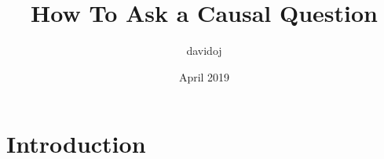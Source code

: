\documentclass{article}
\title{How To Ask a Causal Question}
\author{davidoj }
\date{April 2019}
\begin{document}
\maketitle

\section{Introduction}
\end{document}
